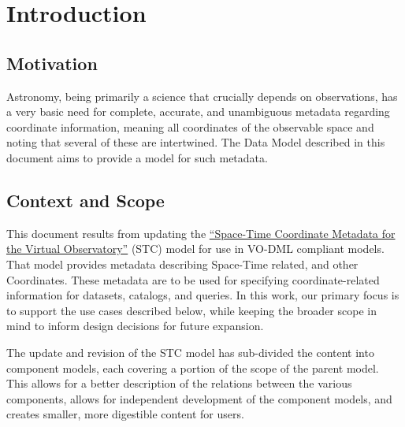 \documentclass[11pt,a4paper]{ivoa}
\begin{document}
\section{Introduction}

\subsection{Motivation}
Astronomy, being primarily a science that crucially depends on observations, has a very basic 
need for complete, accurate, and unambiguous metadata regarding coordinate information, meaning 
all coordinates of the observable space and noting that several of these are intertwined. The Data 
Model described in this document aims to provide a model for such metadata.

\subsection{Context and Scope}
This document results from updating the \href{http://www.ivoa.net/documents/latest/STC.html}{``Space-Time Coordinate Metadata for the Virtual Observatory''} (STC) \citep{2007ivoa.spec.1030R} model for use in VO-DML compliant models. That model provides metadata describing Space-Time related, and other Coordinates. These metadata are to be used for specifying coordinate-related information for datasets, catalogs, and queries.  In this work, our primary focus is to support the use cases described below, while keeping the broader scope in mind to inform design decisions for future expansion.

The update and revision of the STC model has sub-divided the content into component models, each covering a portion of the scope of the parent model.  This allows for a better description of the relations between the various components, allows for independent development of the component models, and creates smaller, more digestible content for users.
\end{document}
